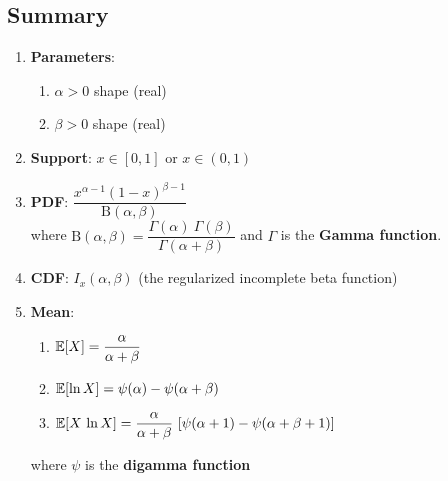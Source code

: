 \subsection{Summary}

\begin{enumerate}
    \item \textbf{Parameters}: 
    \begin{enumerate}
        \item $\alpha > 0$ shape (real)
        \hfill \cite{wiki/Beta_distribution}
        
        \item $\beta > 0$ shape (real)
        \hfill \cite{wiki/Beta_distribution}
    \end{enumerate}

    \item \textbf{Support}:  ${\displaystyle x\in [0,1]\!}$ or ${\displaystyle x\in (0,1)\!}$
    \hfill \cite{wiki/Beta_distribution}

    \item \textbf{PDF}:  ${\displaystyle {\dfrac {x^{\alpha -1}(1-x)^{\beta -1}}{\mathrm {B} (\alpha ,\beta )}}\!}$ 
    \hfill \cite{wiki/Beta_distribution}
    \\
    where ${\displaystyle \mathrm {B} (\alpha ,\beta )={\dfrac {\Gamma (\alpha )\ \Gamma (\beta )}{\Gamma (\alpha +\beta )}}}$ and ${\displaystyle \Gamma }$ is the \textbf{Gamma function}.
    \hfill \cite{wiki/Beta_distribution}

    \item \textbf{CDF}:  ${\displaystyle I_{x}(\alpha ,\beta )\!}$ (the regularized incomplete beta function)
    \hfill \cite{wiki/Beta_distribution}


    \item \textbf{Mean}:
    \begin{enumerate}
        \item ${\displaystyle \mathbb{E} [X]={\dfrac {\alpha }{\alpha +\beta }}\!}$
        \hfill \cite{wiki/Beta_distribution}

        \item ${\displaystyle \mathbb{E}[\ln X]=\psi (\alpha )-\psi (\alpha +\beta )\!}$
        \hfill \cite{wiki/Beta_distribution}

        \item ${\displaystyle \mathbb{E} [X\,\ln X]={\dfrac {\alpha }{\alpha +\beta }}\,\left[\psi (\alpha +1)-\psi (\alpha +\beta +1)\right]\!}$
        \hfill \cite{wiki/Beta_distribution}
    \end{enumerate}
    where ${\displaystyle \psi }$ is the \textbf{digamma function}
    \hfill \cite{wiki/Beta_distribution}


\end{enumerate}
